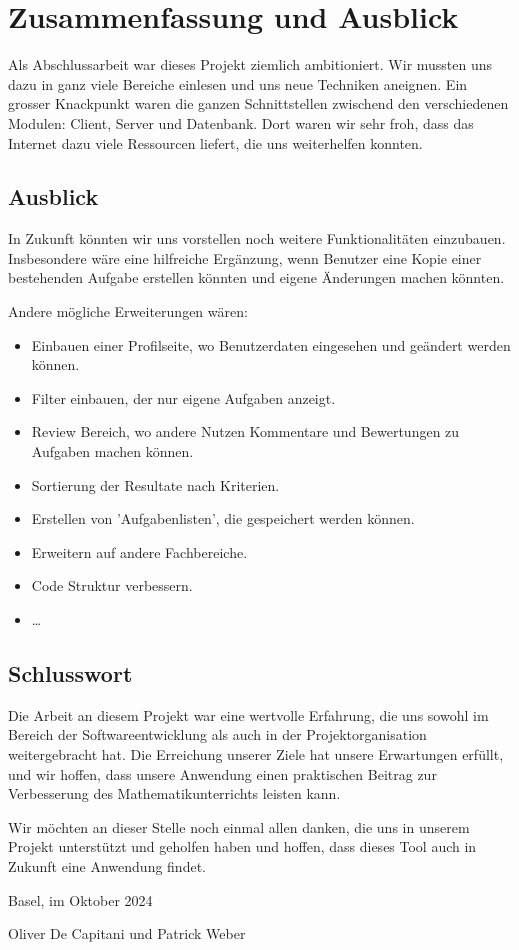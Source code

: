 \section{Zusammenfassung und Ausblick}
Als Abschlussarbeit war dieses Projekt ziemlich ambitioniert. Wir mussten uns dazu in ganz viele Bereiche einlesen und uns neue Techniken aneignen. Ein grosser Knackpunkt waren die ganzen Schnittstellen zwischend den verschiedenen Modulen: Client, Server und Datenbank. Dort waren wir sehr froh, dass das Internet dazu viele Ressourcen liefert, die uns weiterhelfen konnten. 




\subsection{Ausblick}
In Zukunft könnten wir uns vorstellen noch weitere Funktionalitäten einzubauen. Insbesondere wäre eine hilfreiche Ergänzung, wenn Benutzer eine Kopie einer bestehenden Aufgabe erstellen könnten und eigene Änderungen machen könnten.

Andere mögliche Erweiterungen wären:
\begin{itemize}
    \item Einbauen einer Profilseite, wo Benutzerdaten eingesehen und geändert werden können. 
    \item Filter einbauen, der nur eigene Aufgaben anzeigt.
    \item Review Bereich, wo andere Nutzen Kommentare und Bewertungen zu Aufgaben machen können.
    \item Sortierung der Resultate nach Kriterien.
    \item Erstellen von 'Aufgabenlisten', die gespeichert werden können.
    \item Erweitern auf andere Fachbereiche.
    \item Code Struktur verbessern.
    \item \ldots
\end{itemize}


\subsection{Schlusswort}
Die Arbeit an diesem Projekt war eine wertvolle Erfahrung, die uns sowohl im Bereich der Softwareentwicklung als auch in der Projektorganisation weitergebracht hat. Die Erreichung unserer Ziele hat unsere Erwartungen erfüllt, und wir hoffen, dass unsere Anwendung einen praktischen Beitrag zur Verbesserung des Mathematikunterrichts leisten kann.

Wir möchten an dieser Stelle noch einmal allen danken, die uns in unserem Projekt unterstützt und geholfen haben und hoffen, dass dieses Tool auch in Zukunft eine Anwendung findet.


\begin{flushright}
    Basel, im Oktober 2024
    
    Oliver De Capitani und Patrick Weber
\end{flushright}